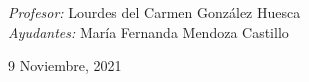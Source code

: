\begin{center}
\begin{minipage}{0.46\textwidth}
        \begin{flushright} \large						\small										
            \emph{Profesor:} 
            Lourdes del Carmen González Huesca  \\
           \emph{Ayudantes:} 
           María Fernanda Mendoza Castillo \\
        \end{flushright}																	
    \end{minipage}	
    \vspace*{1cm}
    \vspace{2cm}
    \begin{center}						
        {\large 9 Noviembre, 2021}
    \end{center}  						
\end{center}	
\textbf{}